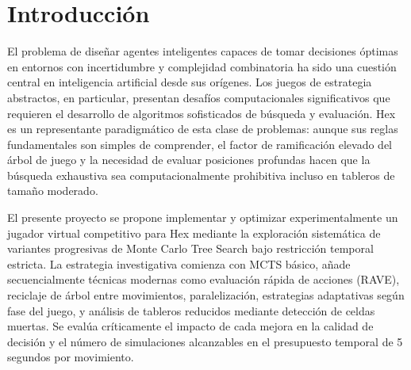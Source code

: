 \documentclass[12pt]{article}
\begin{document}
\begin{abstract}
	\noindent
	Hex is a two-player strategic combinatorial board game played on a board with hexagonal cells. Despite its apparent simplicity in rules, the game presents a search space with significant computational complexity that makes it an interesting testbed for search algorithms and decision-making in artificial intelligence. This work focuses on the implementation and experimental analysis of progressively improved Monte Carlo Tree Search strategies, incorporating complementary techniques such as rapid action value estimation, search tree recycling, parallelization, and reduced board analysis. Each strategy is critically evaluated under strict time constraint of 5 seconds per move, resulting in identification of MCTS with rapid action value estimation as the most effective paradigm under the project constraints.
	
	\textbf{Keywords:} \textit{Hex, Monte Carlo Tree Search, combinatorial games, search algorithms, artificial intelligence}
\end{abstract}

\newpage
\tableofcontents
\newpage

\section*{Introducción}

El problema de diseñar agentes inteligentes capaces de tomar decisiones óptimas en entornos con incertidumbre y complejidad combinatoria ha sido una cuestión central en inteligencia artificial desde sus orígenes. Los juegos de estrategia abstractos, en particular, presentan desafíos computacionales significativos que requieren el desarrollo de algoritmos sofisticados de búsqueda y evaluación. Hex es un representante paradigmático de esta clase de problemas: aunque sus reglas fundamentales son simples de comprender, el factor de ramificación elevado del árbol de juego y la necesidad de evaluar posiciones profundas hacen que la búsqueda exhaustiva sea computacionalmente prohibitiva incluso en tableros de tamaño moderado.

El presente proyecto se propone implementar y optimizar experimentalmente un jugador virtual competitivo para Hex mediante la exploración sistemática de variantes progresivas de Monte Carlo Tree Search bajo restricción temporal estricta. La estrategia investigativa comienza con MCTS básico, añade secuencialmente técnicas modernas como evaluación rápida de acciones (RAVE), reciclaje de árbol entre movimientos, paralelización, estrategias adaptativas según fase del juego, y análisis de tableros reducidos mediante detección de celdas muertas. Se evalúa críticamente el impacto de cada mejora en la calidad de decisión y el número de simulaciones alcanzables en el presupuesto temporal de 5 segundos por movimiento.
\end{document}

